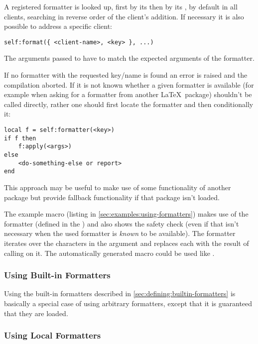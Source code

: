 \documentclass[12pt]{scrartcl}
\begin{document}
A registered formatter is looked up, first by its  then by its , by default in all clients, searching in reverse order of the client's addition.  If necessary it is also possible to address a specific client:

\begin{verbatim}
self:format({ <client-name>, <key> }, ...)
\end{verbatim}

\noindent The arguments passed to  have to match the expected arguments of the formatter.

If no formatter with the requested key/name is found an error is raised and the
compilation aborted.  If it is not known whether a given formatter is available
(for example when asking for a formatter from another \LaTeX\ package)
 shouldn't be called directly, rather one should first locate
the formatter and then conditionally  it:

\begin{verbatim}
local f = self:formatter(<key>)
if f then
	f:apply(<args>)
else
	<do-something-else or report>
end
\end{verbatim}

\noindent This approach may be useful to make use of some functionality of
another package but provide fallback functionality if that package isn't loaded.

The example macro  (listing in
\vref{sec:examples:using-formatters}) makes use of the formatter 
(defined in the  ) and also shows the
safety check (even if that isn't necessary when the used formatter is
\emph{known} to be available). The formatter iterates over the characters in the
 argument and replaces each with the result of calling
 on it.  The automatically generated macro could be used like
.


\subsubsection{Using Built-in Formatters}
\label{sec:advanced:modular:builtin-formatters}

Using the built-in formatters described in \vref{sec:defining:builtin-formatters} is basically a special case of using arbitrary formatters, except that it is guaranteed that they are loaded.


\subsubsection{Using Local Formatters}
\label{sec:advanced:modular:local-formatters}
\end{document}
